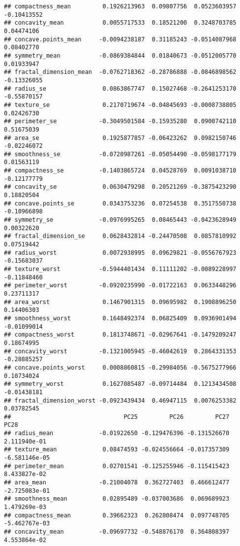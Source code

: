 \documentclass[
]{article}
\begin{document}
\begin{verbatim}
## compactness_mean         0.1926213963  0.09807756  0.0523603957 -0.10413552
## concavity_mean           0.0055717533  0.18521200  0.3248703785  0.04474106
## concave.points_mean     -0.0094238187  0.31185243 -0.0514087968  0.08402770
## symmetry_mean           -0.0869384844  0.01840673 -0.0512005770  0.01933947
## fractal_dimension_mean  -0.0762718362 -0.28786888 -0.0846898562 -0.13326055
## radius_se                0.0863867747  0.15027468 -0.2641253170 -0.55870157
## texture_se               0.2170719674 -0.04845693 -0.0008738805  0.02426730
## perimeter_se            -0.3049501584 -0.15935280  0.0900742110  0.51675039
## area_se                  0.1925877857 -0.06423262  0.0982150746 -0.02246072
## smoothness_se           -0.0720987261 -0.05054490 -0.0598177179  0.01563119
## compactness_se          -0.1403865724  0.04528769  0.0091038710 -0.12177779
## concavity_se             0.0630479298  0.20521269 -0.3875423290  0.18820504
## concave.points_se        0.0343753236  0.07254538  0.3517550738 -0.10966898
## symmetry_se             -0.0976995265  0.08465443 -0.0423628949  0.00322620
## fractal_dimension_se     0.0628432814 -0.24470508  0.0857810992  0.07519442
## radius_worst             0.0072938995  0.09629821 -0.0556767923 -0.15683037
## texture_worst           -0.5944401434  0.11111202 -0.0089228997 -0.11848460
## perimeter_worst         -0.0920235990 -0.01722163  0.0633448296  0.23711317
## area_worst               0.1467901315  0.09695982  0.1908896250  0.14406303
## smoothness_worst         0.1648492374  0.06825409  0.0936901494 -0.01099014
## compactness_worst        0.1813748671 -0.02967641 -0.1479209247  0.18674995
## concavity_worst         -0.1321005945 -0.46042619  0.2864331353 -0.28885257
## concave.points_worst     0.0008860815 -0.29984056 -0.5675277966  0.10734024
## symmetry_worst           0.1627085487 -0.09714484  0.1213434508 -0.01438181
## fractal_dimension_worst -0.0923439434  0.46947115  0.0076253382  0.03782545
##                                PC25         PC26         PC27          PC28
## radius_mean             -0.01922650 -0.129476396 -0.131526670  2.111940e-01
## texture_mean             0.08474593 -0.024556664 -0.017357309 -6.581146e-05
## perimeter_mean           0.02701541 -0.125255946 -0.115415423  8.433827e-02
## area_mean               -0.21004078  0.362727403  0.466612477 -2.725083e-01
## smoothness_mean          0.02895489 -0.037003686  0.069689923  1.479269e-03
## compactness_mean         0.39662323  0.262808474  0.097748705 -5.462767e-03
## concavity_mean          -0.09697732 -0.548876170  0.364808397  4.553864e-02

\end{verbatim}
\end{document}

